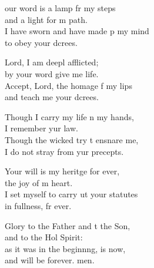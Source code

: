 \settowidth{\versewidth}{I set myself to carry out your statutes *}
\begin{psalmverse}%
  \begin{patverse}
our word is a lamp fr my steps\Med\\
and a light for m path.\\
I have sworn and have made p my mind\Med\\
to obey your dcrees.

Lord, I am deepl afflicted;\Med\\
by your word give me life.\\
Accept, Lord, the homage f my lips\Med\\
and teach me your dcrees.

Though I carry my life n my hands,\Med\\
I remember yur law.\\
Though the wicked try t ensnare me,\Med\\
I do not stray from yur precepts.

Your will is my heritge for ever,\Med\\
the joy of m heart.\\
I set myself to carry ut your statutes\Med\\
in fullness, fr ever.

Glory to the Father and t the Son,\Med\\
and to the Hol Spirit:\\
as it was in the beginnng, is now,\Med\\
and will be forever. men. 
  \end{patverse}
\end{psalmverse}

